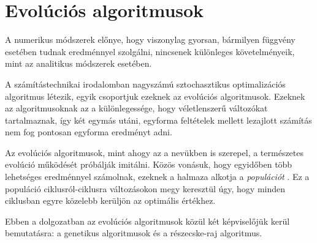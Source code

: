 \chapter{Evolúciós algoritmusok}

A numerikus módszerek előnye, hogy viszonylag gyorsan, bármilyen függvény esetében tudnak eredménnyel szolgálni, nincsenek különleges követelményeik, mint az analitikus módszerek esetében.

A számítástechnikai irodalomban nagyszámú sztochasztikus optimalizációs algoritmus létezik, egyik csoportjuk ezeknek az evolúciós algoritmusok. Ezeknek az algoritmusoknak az a különlegessége, hogy véletlenszerű változókat tartalmaznak, így két egymás utáni, egyforma feltételek mellett lezajlott számítás nem fog pontosan egyforma eredményt adni.

Az evolúciós algoritmusok, mint ahogy az a nevükben is szerepel, a természetes evolúció működését próbálják imitálni. Közös vonásuk, hogy egyidőben több lehetséges eredménnyel számolnak, ezeknek a halmaza alkotja a \textit{populációt} . Ez a populáció ciklusról-ciklusra változásokon megy keresztül úgy, hogy minden ciklusban egyre közelebb kerüljön az optimális értékhez.

Ebben a dolgozatban az evolúciós algoritmusok közül két képviselőjük kerül bemutatásra: a genetikus algoritmusok és a részecske-raj algoritmus.
